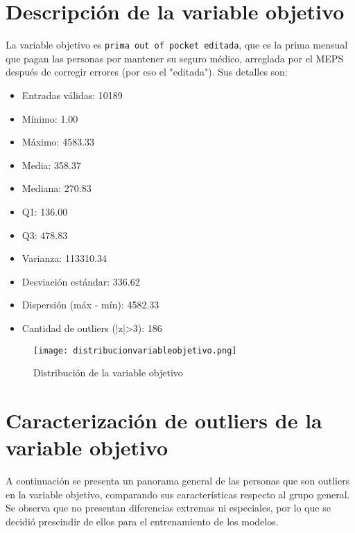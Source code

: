 \documentclass[12pt]{article}
\begin{document}
\section{Descripción de la variable objetivo}
La variable objetivo es \texttt{prima out of pocket editada}, que es la prima mensual que pagan las personas por mantener su seguro médico, arreglada por el MEPS después de corregir errores (por eso el "editada"). Sus detalles son:

\begin{itemize}
    \item Entradas válidas: 10189
    \item Mínimo: 1.00
    \item Máximo: 4583.33
    \item Media: 358.37
    \item Mediana: 270.83
    \item Q1: 136.00
    \item Q3: 478.83
    \item Varianza: 113310.34
    \item Desviación estándar: 336.62
    \item Dispersión (máx - mín): 4582.33
    \item Cantidad de outliers (|z|>3): 186
\end{itemize}

\begin{figure}[h!]
    \centering
    \texttt{[image: distribucionvariableobjetivo.png]}
    \caption{Distribución de la variable objetivo}
\end{figure}

\section{Caracterización de outliers de la variable objetivo}
A continuación se presenta un panorama general de las personas que son outliers en la variable objetivo, comparando sus características respecto al grupo general. Se observa que no presentan diferencias extremas ni especiales, por lo que se decidió prescindir de ellos para el entrenamiento de los modelos.
\end{document}
